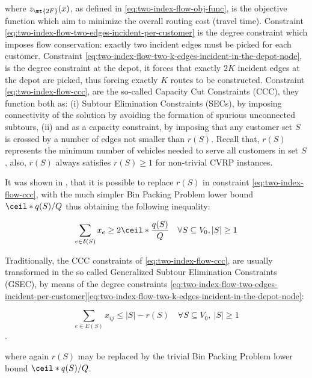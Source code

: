 where $z_\mt{2F}(x)$, as defined in \eqref{eq:two-index-flow-obj-func}, is the objective function which aim to minimize the overall routing cost (travel time).
Constraint \eqref{eq:two-index-flow-two-edges-incident-per-customer} is the degree constraint which imposes flow conservation: exactly two incident edges must be picked for each customer.
Constraint \eqref{eq:two-index-flow-two-k-edges-incident-in-the-depot-node}, is the degree constraint at the depot, it forces that exactly $2K$ incident edges at the depot are picked, thus forcing exactly $K$ routes to be constructed.
Constraint \eqref{eq:two-index-flow-ccc}, are the so-called Capacity Cut Constraints (CCC), they function both as:
(i) Subtour Elimination Constraints (SECs), by imposing connectivity of the solution by avoiding the formation of spurious unconnected subtours,
(ii) and as a capacity constraint, by imposing that any customer set $S$ is crossed by a number of edges not smaller than $r(S)$.
Recall that, $r(S)$ represents the minimum number of vehicles needed to serve all customers in set $S$,
also, $r(S)$ always satisfies $r(S) \ge 1$ for non-trivial CVRP instances.

It was shown in \textcite{cornuejols1993}, that it is possible to replace $r(S)$ in constraint
\eqref{eq:two-index-flow-ccc}, with the much simpler Bin Packing Problem lower bound $\ceil*{q(S) / Q}$
thus obtaining the following inequality:

\begin{equation}
    \sum_{e \in \delta(S)} x_e \ge 2 \ceil*{\frac{q(S)}{Q}}   \quad \forall S \subseteq V_0, |S| \ge 1 \label{eq:two-index-flow-ccc-bpp-lower-bound}                                                             \\
\end{equation}

Traditionally, the CCC constraints of \eqref{eq:two-index-flow-ccc}, are usually transformed in the so called Generalized Subtour Elimination Constraints (GSEC),
by means of the degree constraints \eqref{eq:two-index-flow-two-edges-incident-per-customer}\eqref{eq:two-index-flow-two-k-edges-incident-in-the-depot-node}:

\begin{equation}\label{eq:cvrp-2flow-gsec}
	\sum_{e \in E(S)} x_{ij} \le |S| - r(S) \quad \forall S \subseteq V_0,\ |S| \ge 1
\end{equation}.

where again $r(S)$ may be replaced by the trivial Bin Packing Problem lower bound $\ceil*{q(S) / Q}$.

